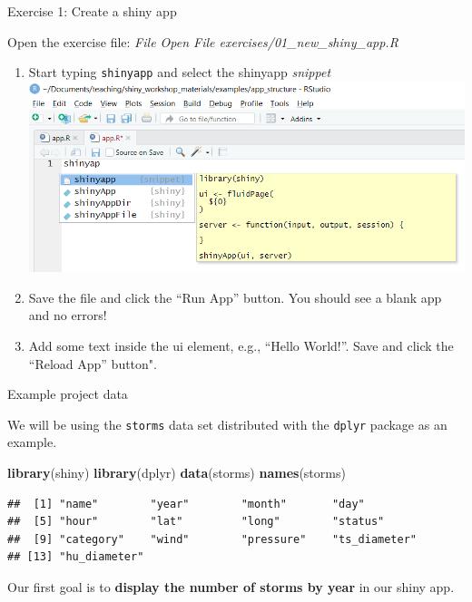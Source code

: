 \documentclass[
  12pt,
  ignorenonframetext,
]{beamer}
\newenvironment{Shaded}{\begin{snugshade}}{\end{snugshade}}
\newcommand{\KeywordTok}[1]{\textcolor[rgb]{0.13,0.29,0.53}{\textbf{#1}}}
\newcommand{\NormalTok}[1]{#1}
\begin{document}
\begin{frame}[fragile]{Exercise 1: Create a shiny app}
\protect\hypertarget{exercise-1-create-a-shiny-app}{}

Open the exercise file: \emph{File \rightarrow Open File
\rightarrow exercises/01\_new\_shiny\_app.R}

\begin{enumerate}
\item
  Start typing \texttt{shinyapp} and select the shinyapp \emph{snippet}
  \includegraphics{./img/shiny_snippet.png}
\item
  Save the file and click the ``Run App'' button. You should see a blank
  app and no errors!
\item
  Add some text inside the ui element, e.g., ``Hello World!''. Save and
  click the ``Reload App'' button".
\end{enumerate}

\end{frame}

\begin{frame}[fragile]{Example project data}
\protect\hypertarget{example-project-data}{}

We will be using the \texttt{storms} data set distributed with the
\texttt{dplyr} package as an example.

\begin{Shaded}
\begin{Highlighting}[]
\KeywordTok{library}\NormalTok{(shiny)}
\KeywordTok{library}\NormalTok{(dplyr)}
\KeywordTok{data}\NormalTok{(storms)}
\KeywordTok{names}\NormalTok{(storms)}
\end{Highlighting}
\end{Shaded}

\begin{verbatim}
##  [1] "name"        "year"        "month"       "day"        
##  [5] "hour"        "lat"         "long"        "status"     
##  [9] "category"    "wind"        "pressure"    "ts_diameter"
## [13] "hu_diameter"
\end{verbatim}

Our first goal is to \textbf{display the number of storms by year} in
our shiny app.

\end{frame}
\end{document}
